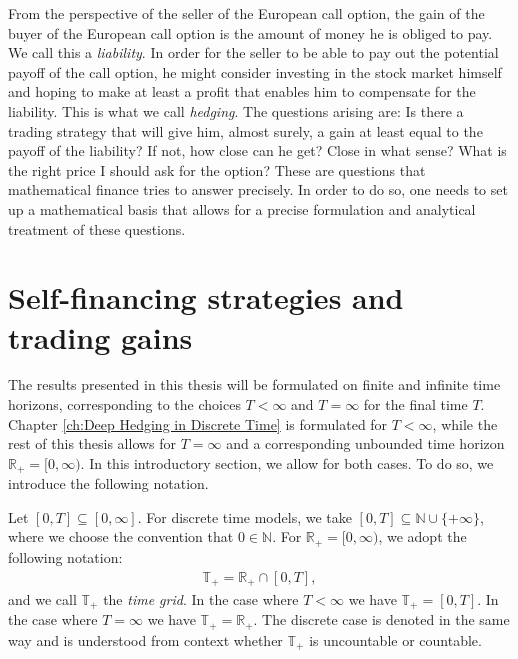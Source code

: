 \documentclass[11pt,a4paper,twoside,openany]{report}
\numberwithin{equation}{section}
\theoremstyle{plain} %
\theoremstyle{definition} %
\theoremstyle{remark} %
\begin{document}
From the perspective of the seller of the European call option, the gain of the buyer of the European call option is the amount of money he is obliged to pay. We call this a \textit{liability}. In order for the seller to be able to pay out the potential payoff of the call option, he might consider investing in the stock market himself and hoping to make at least a profit that enables him to compensate for the liability. This is what we call \textit{hedging}. The questions arising are: Is there a trading strategy that will give him, almost surely, a gain at least equal to the payoff of the liability? If not, how close can he get? Close in what sense? What is the right price I should ask for the option? These are questions that mathematical finance tries to answer precisely. In order to do so, one needs to set up a mathematical basis that allows for a precise formulation and analytical treatment of these questions.

\section{Self-financing strategies and trading gains}
The results presented in this thesis will be formulated on finite and infinite time horizons, corresponding to the choices \(T<\infty\) and \(T=\infty\) for the final time \(T\). Chapter \ref{ch:Deep Hedging in Discrete Time} is formulated for \(T<\infty\), while the rest of this thesis allows for \(T=\infty\) and a corresponding unbounded time horizon \(\mathbb{R}_+=[0,\infty)\). In this introductory section, we allow for both cases. To do so, we introduce the following notation.


Let \([0,T]\subseteq[0,\infty]\). For discrete time models, we take \([0,T]\subseteq\mathbb{N}\cup\{+\infty\}\), where we choose the convention that \(0\in\mathbb{N}\). For \(\mathbb{R}_+=[0,\infty)\), we adopt the following notation: 
\begin{align*}
    \mathbb{T}_+=\mathbb{R}_+\cap [0,T],
\end{align*}
and we call \(\mathbb{T}_+\) the \textit{time grid}.
In the case where \(T<\infty\) we have \(\mathbb{T}_+=[0,T]\). In the case where \(T=\infty\) we have \(\mathbb{T}_+=\mathbb{R}_+\). The discrete case is denoted in the same way and is understood from context whether \(\mathbb{T}_+\) is uncountable or countable.
\end{document}
